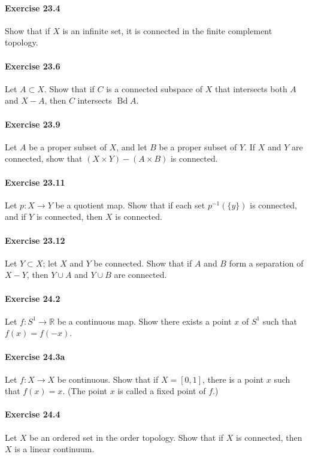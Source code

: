 \documentclass{article}
\begin{document}
\paragraph{Exercise 23.4} Show that if $X$ is an infinite set, it is connected in the finite complement topology.

\paragraph{Exercise 23.6} Let $A \subset X$. Show that if $C$ is a connected subspace of $X$ that intersects both $A$ and $X-A$, then $C$ intersects $\operatorname{Bd} A$.

\paragraph{Exercise 23.9} Let $A$ be a proper subset of $X$, and let $B$ be a proper subset of $Y$. If $X$ and $Y$ are connected, show that $(X \times Y)-(A \times B)$ is connected.

\paragraph{Exercise 23.11} Let $p: X \rightarrow Y$ be a quotient map. Show that if each set $p^{-1}(\{y\})$ is connected, and if $Y$ is connected, then $X$ is connected.

\paragraph{Exercise 23.12} Let $Y \subset X$; let $X$ and $Y$ be connected. Show that if $A$ and $B$ form a separation of $X-Y$, then $Y \cup A$ and $Y \cup B$ are connected.

\paragraph{Exercise 24.2} Let $f: S^{1} \rightarrow \mathbb{R}$ be a continuous map. Show there exists a point $x$ of $S^{1}$ such that $f(x)=f(-x)$.

\paragraph{Exercise 24.3a} Let $f \colon X \rightarrow X$ be continuous. Show that if $X = [0, 1]$, there is a point $x$ such that $f(x) = x$. (The point $x$ is called a fixed point of $f$.)

\paragraph{Exercise 24.4} Let $X$ be an ordered set in the order topology. Show that if $X$ is connected, then $X$ is a linear continuum.
\end{document}
